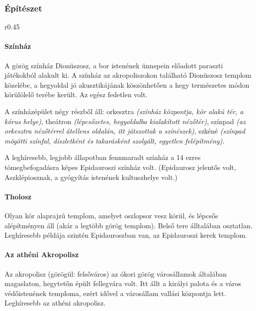\subsubsection{Építészet}

\begin{wrapfigure}{r}{0.45\textwidth}
\end{wrapfigure}

\paragraph{Színház}
A görög színház Dionüszosz, a bor istenének ünnepein előadott paraszti játékokból alakult ki. A színház az akropoliszokon található Dionüszosz templom közelébe, a hegyoldal jó akusztikájának köszönhetően a hegy természetes módon körülölelő terébe került. Az egész fedetlen volt.

A színházépület négy részből áll: orkesztra \textit{(színház központja, kör alakú tér, a kórus helye)}, theátron \textit{(lépcsőzetes, hegyoldalba kialakított nézőtér)}, színpad \textit{(az orkesztra nézőtérrel átellens oldalán, itt játszottak a színészek)}, szkéné \textit{(színpad mögötti színfal, díszletként és takarásként szolgált, egyetlen felépítmény)}.

A leghíresebb, legjobb állapotban fennmaradt színház a 14 ezres tömegbefogadásra képes Epidauroszi színház volt. (Epidaurosz jelentős volt, Aszklépiosznak, a gyógyítás istenének kultuszhelye volt.)



\paragraph{Tholosz}
Olyan kör alaprajzú templom, amelyet oszlopsor vesz körül, és lépcsős alépítményen áll (akár a legtöbb  görög templom). Belső tere álltalában osztatlan. Leghíresebb példája szintén Epidauroszban van, az Epidauroszi kerek templom.

\paragraph{Az athéni Akropolisz}
Az akropolisz (görögül: felsőváros) az ókori görög városállamok általában magaslaton, hegytetőn épült fellegvára volt. Itt állt a királyi palota és a város védőistenének temploma, ezért idővel a városállam vallási központja lett. Leghíresebb az athéni akropolisz.

